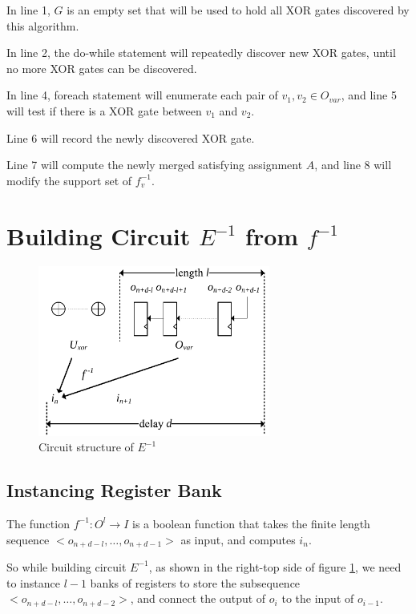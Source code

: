 \documentclass[journal]{IEEEtran}
\begin{document}
In line 1,
$G$ is an empty set that will be used to hold all XOR gates discovered by this algorithm.

In line 2, the do-while statement will repeatedly discover new XOR gates,
until no more XOR gates can be discovered.

In line 4,
foreach statement will enumerate each pair of $v_1,v_2\in O_{var}$,
and line 5 will test if there is a XOR gate between $v_1$ and $v_2$.

Line 6 will record the newly discovered XOR gate.

Line 7 will compute the newly merged satisfying assignment $A$,
and line 8 will modify the support set of $f^{-1}_v$.

\section{Building Circuit $E^{-1}$ from $f^{-1}$}\label{sec_build}
\begin{figure}[!t]
\centering
\includegraphics[width=3in]{reg_bank}
\caption{Circuit structure of $E^{-1}$}
\label{reg_bank}
\end{figure}

\subsection{Instancing Register Bank}
The function $f^{-1}:O^l\to I$ is a boolean function that takes the finite length sequence $<o_{n+d-l},\dots , o_{n+d-1} >$ as input,
and computes $i_n$.

So while building circuit $E^{-1}$,
as shown in the right-top side of figure \ref{reg_bank},
we need to instance $l-1$ banks of registers to store the subsequence $<o_{n+d-l},\dots , o_{n+d-2} >$,
and connect the output of $o_i$ to the input of $o_{i-1}$.
\end{document}
